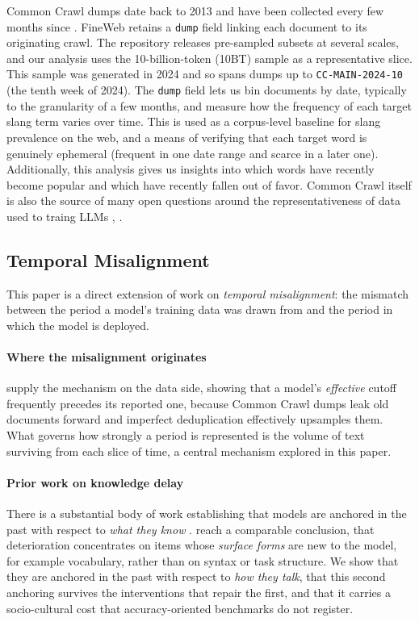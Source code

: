 \documentclass[11pt]{article}
\begin{document}
Common Crawl dumps date back to 2013 and have been collected every few months since \citep{commoncrawl2007}. FineWeb retains a \texttt{dump} field linking each document to its originating crawl. The repository releases pre-sampled subsets at several scales, and our analysis uses the 10-billion-token (10BT) sample as a representative slice. This sample was generated in 2024 and so spans dumps up to \texttt{CC-MAIN-2024-10} (the tenth week of 2024). The \texttt{dump} field lets us bin documents by date, typically to the granularity of a few months, and measure how the frequency of each target slang term varies over time. This is used as a corpus-level baseline for slang prevalence on the web, and a means of verifying that each target word is genuinely ephemeral (frequent in one date range and scarce in a later one). Additionally, this analysis gives us insights into which words have recently become popular and which have recently fallen out of favor. %
Common Crawl itself is also the source of many open questions around the representativeness of data used to traing LLMs \citep{baack2024commoncrawl}, \citep{luccioni2021commoncrawl}.

\subsection{Temporal Misalignment}%
\label{sec:rw-temporal}

This paper is a direct extension of work on \textit{temporal misalignment}: the mismatch between the period a model's training data was drawn from and the period in which the model is deployed.

\paragraph{Where the misalignment originates} \citet{cheng2024dated} supply the mechanism on the data side, showing that a model's \textit{effective} cutoff frequently precedes its reported one, because Common Crawl dumps leak old documents forward and imperfect deduplication effectively upsamples them. What governs how strongly a period is represented is the volume of text surviving from each slice of time, a central mechanism explored in this paper.

\paragraph{Prior work on knowledge delay} There is a substantial body of work establishing that models are anchored in the past with respect to \textit{what they know} \citep{luu2022temporal, zhang2023mitigatingtemporal, zhao2024temporal, cheng2024dated}. \citet{agarwal2022temporal} reach a comparable conclusion, that deterioration concentrates on items whose \textit{surface forms} are new to the model, for example vocabulary, rather than on syntax or task structure. We show that they are anchored in the past with respect to \textit{how they talk}, that this second anchoring survives the interventions that repair the first, and that it carries a socio-cultural cost that accuracy-oriented benchmarks do not register. %
\end{document}
